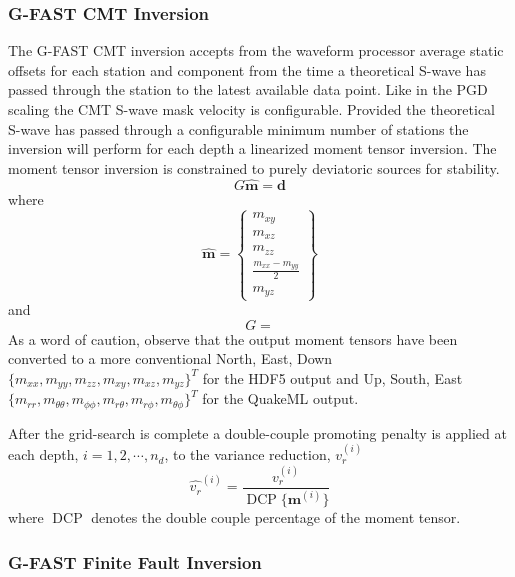 \documentclass[12pt]{article}
\begin{document}
\subsubsection{G-FAST CMT Inversion}
The G-FAST CMT inversion accepts from the waveform processor average static offsets for each station
and component from the time a theoretical S-wave has passed through the station to the latest available
data point.  Like in the PGD scaling the CMT S-wave mask velocity is configurable.  Provided the
theoretical S-wave has passed through a configurable minimum number of stations the inversion will
perform for each depth a linearized moment tensor inversion.  The moment tensor inversion is 
constrained to purely deviatoric sources for stability.  
\begin{equation}
  G \hat{\textbf{m}} = \textbf{d}
\end{equation}
where 
\begin{equation}
   \hat{\textbf{m}} 
 = \left \{ 
     \begin{array}{c} 
       m_{xy} \\ m_{xz} \\ m_{zz} \\ \frac{m_{xx} - m_{yy}}{2} \\ m_{yz} 
     \end{array}
   \right \}
\end{equation}
and 
\begin{equation}
  G =
\end{equation}
As a word of caution, observe that the output moment tensors have been converted to a
more conventional North, East, Down \citep[e.g.][]{jostAndHerrmann} 
$\{m_{xx}, m_{yy}, m_{zz}, m_{xy}, m_{xz}, m_{yz}\}^T$ for the HDF5 output 
and Up, South, East
\citep[e.g.][]{globalCMT} 
$\{m_{rr}, m_{\theta \theta}, m_{\phi \phi}, m_{r \theta}, m_{r \phi}, m_{\theta \phi} \}^T$
for the QuakeML output.  

After the grid-search is complete a double-couple promoting penalty is applied at each depth,
$i=1,2,\cdots, n_{d}$, to the variance reduction, $v_r^{(i)}$ 
\begin{equation}
  \hat{v_r}^{(i)} = \frac{v_r^{(i)}}{\operatorname{DCP}\{\textbf{m}^{(i)}\}}
\end{equation}
where $\operatorname{DCP}$ denotes the double couple percentage of the moment tensor.  

\subsubsection{G-FAST Finite Fault Inversion}
\end{document}
